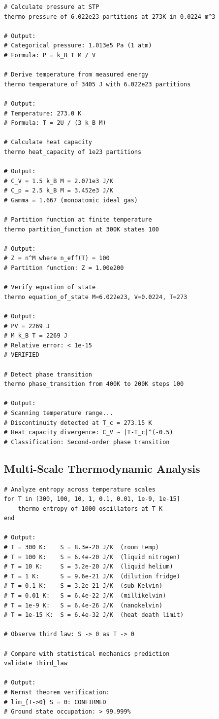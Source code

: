\documentclass[twocolumn,10pt]{article}
\begin{document}
\begin{lstlisting}[caption={Thermodynamic state calculations}]
# Calculate pressure at STP
thermo pressure of 6.022e23 partitions at 273K in 0.0224 m^3

# Output:
# Categorical pressure: 1.013e5 Pa (1 atm)
# Formula: P = k_B T M / V

# Derive temperature from measured energy
thermo temperature of 3405 J with 6.022e23 partitions

# Output:
# Temperature: 273.0 K
# Formula: T = 2U / (3 k_B M)

# Calculate heat capacity
thermo heat_capacity of 1e23 partitions

# Output:
# C_V = 1.5 k_B M = 2.071e3 J/K
# C_p = 2.5 k_B M = 3.452e3 J/K
# Gamma = 1.667 (monoatomic ideal gas)

# Partition function at finite temperature
thermo partition_function at 300K states 100

# Output:
# Z = n^M where n_eff(T) = 100
# Partition function: Z = 1.00e200

# Verify equation of state
thermo equation_of_state M=6.022e23, V=0.0224, T=273

# Output:
# PV = 2269 J
# M k_B T = 2269 J
# Relative error: < 1e-15
# VERIFIED

# Detect phase transition
thermo phase_transition from 400K to 200K steps 100

# Output:
# Scanning temperature range...
# Discontinuity detected at T_c = 273.15 K
# Heat capacity divergence: C_V ~ |T-T_c|^(-0.5)
# Classification: Second-order phase transition
\end{lstlisting}

\subsection{Multi-Scale Thermodynamic Analysis}

\begin{lstlisting}[caption={Temperature-dependent state counting}]
# Analyze entropy across temperature scales
for T in [300, 100, 10, 1, 0.1, 0.01, 1e-9, 1e-15]
    thermo entropy of 1000 oscillators at T K
end

# Output:
# T = 300 K:    S = 8.3e-20 J/K  (room temp)
# T = 100 K:    S = 6.4e-20 J/K  (liquid nitrogen)
# T = 10 K:     S = 3.2e-20 J/K  (liquid helium)
# T = 1 K:      S = 9.6e-21 J/K  (dilution fridge)
# T = 0.1 K:    S = 3.2e-21 J/K  (sub-Kelvin)
# T = 0.01 K:   S = 6.4e-22 J/K  (millikelvin)
# T = 1e-9 K:   S = 6.4e-26 J/K  (nanokelvin)
# T = 1e-15 K:  S = 6.4e-32 J/K  (heat death limit)

# Observe third law: S -> 0 as T -> 0

# Compare with statistical mechanics prediction
validate third_law

# Output:
# Nernst theorem verification:
# lim_{T->0} S = 0: CONFIRMED
# Ground state occupation: > 99.999%
\end{lstlisting}
\end{document}
